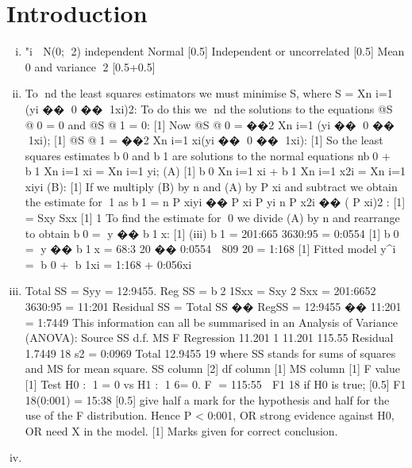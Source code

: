 \documentclass{article}
\author{kobriendublin }
\date{December 2018}
\begin{document}
\section{Introduction}
\begin{enumerate}[(i)]
\item 
"i  N(0; 2) independent
Normal [0.5]
Independent or uncorrelated [0.5]
Mean 0 and variance 2 [0.5+0.5]
\item  To nd the least squares estimators we must minimise S, where
S =
Xn
i=1
(yi �� 0 �� 1xi)2:
To do this we nd the solutions to the equations
@S
@0
= 0 and
@S
@1
= 0:
[1]
Now
@S
@0
= ��2
Xn
i=1
(yi �� 0 �� 1xi); [1]
@S
@1
= ��2
Xn
i=1
xi(yi �� 0 �� 1xi): [1]
So the least squares estimates b0 and b1 are solutions to the normal
equations
nb0 + b1
Xn
i=1
xi =
Xn
i=1
yi; (A) [1]
b0
Xn
i=1
xi + b1
Xn
i=1
x2i
=
Xn
i=1
xiyi (B): [1]
If we multiply (B) by n and (A) by
P
xi and subtract we obtain the
estimate for 1 as
b1 =
n
P
xiyi ��
P
xi
P
yi
n
P
x2i
�� (
P
xi)2 : [1]
=
Sxy
Sxx
[1]
1
To find the estimate for 0 we divide (A) by n and rearrange to obtain
b0 = y �� b1x: [1]
(iii)
b1 =
201:665
3630:95
= 0:0554 [1]
b0 = y �� b1x =
68:3
20
�� 0:0554 
809
20
= 1:168 [1]
Fitted model
y^i = b
0 + b
1xi = 1:168 + 0:056xi
\item Total SS = Syy = 12:9455.
Reg SS = b2
1Sxx = Sxy
2
Sxx
= 201:6652
3630:95 = 11:201
Residual SS = Total SS �� RegSS = 12:9455 �� 11:201 = 1:7449
This information can all be summarised in an Analysis of Variance
(ANOVA):
Source SS d.f. MS F
Regression 11.201 1 11.201 115.55
Residual 1.7449 18 s2 = 0:0969
Total 12.9455 19
where SS stands for sums of squares and MS for mean square.
SS column [2]
df column [1]
MS column [1]
F value [1]
Test H0 : 1 = 0 vs H1 : 1 6= 0.
F = 115:55  F1
18 if H0 is true; [0.5]
F1
18(0:001) = 15:38 [0.5]
give half a mark for the hypothesis and half for the use of the F
distribution.
Hence P < 0:001, OR strong evidence against H0, OR need X in the
model. [1]
Marks given for correct conclusion.

\item
\end{enumerate}
\end{document}
